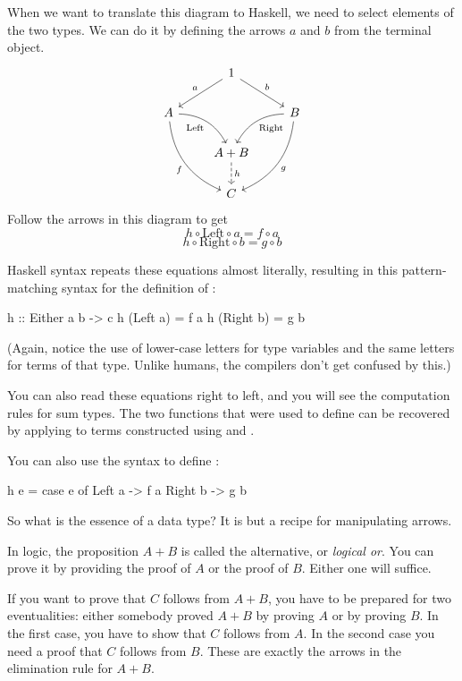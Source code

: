 \documentclass[DaoFP]{subfiles}
\begin{document}
When we want to translate this diagram to Haskell, we need to select elements of the two types. We can do it by defining the arrows $a$ and $b$ from the terminal object. 
\[
 \begin{tikzcd}
 &1
 \arrow[ld, "a"']
 \arrow[rd, "b"]
 \\
 A
 \arrow[dr,  bend left, "\text{Left}"']
 \arrow[ddr, bend right, "f"']
 && B
 \arrow[dl, bend right, "\text{Right}"]
 \arrow[ddl, bend left, "g"]
 \\
&A + B
\arrow[d, dashed, "h"]
\\
& C
 \end{tikzcd}
\]
Follow the arrows in this diagram to get
\[h \circ \text{Left} \circ a = f \circ a\]
\[h \circ \text{Right} \circ b = g \circ b\]

Haskell syntax repeats these equations almost literally, resulting in this pattern-matching syntax for the definition of :

\begin{haskell}
h :: Either a b -> c
h (Left  a) = f a
h (Right b) = g b
\end{haskell}
(Again, notice the use of lower-case letters for type variables and the same letters for terms of that type. Unlike humans, the compilers don't get confused by this.)

You can also read these equations right to left, and you will see the computation rules for sum types. The two functions that were used to define  can be recovered by applying  to terms constructed using  and . 

You can also use the  syntax to define :
\begin{haskell}
h e = case e of
  Left  a -> f a
  Right b -> g b
\end{haskell}

So what is the essence of a data type? It is but a recipe for manipulating arrows.
\bigskip

In logic, the proposition $A + B$ is called the alternative, or \emph{logical or}. You can prove it by providing the proof of $A$ or the proof of $B$. Either one will suffice. 

If you want to prove that $C$ follows from $A+B$, you have to be prepared for two eventualities: either somebody proved $A+B$ by proving $A$ or by proving $B$. In the first case, you have to show that $C$ follows from $A$. In the second case you need a proof that $C$ follows from $B$. These are exactly the arrows in the elimination rule for $A+B$.
\end{document}
